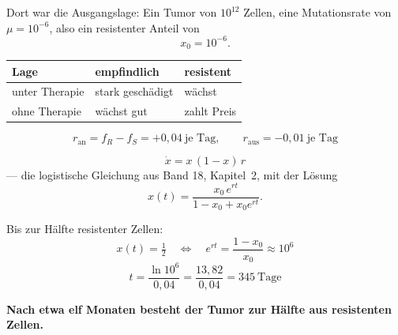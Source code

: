 \begin{merksatz}
Dort war die Ausgangslage: Ein Tumor von $10^{12}$ Zellen, eine Mutationsrate von $\mu = 10^{-6}$, also ein resistenter Anteil von
\[ x_0 = 10^{-6} . \]

\begin{center}
{\small
\renewcommand{\arraystretch}{1.5}
\begin{tabular}{@{}P{2.4cm}P{2.6cm}P{2.6cm}@{}}
\toprule
\textbf{Lage} & \textbf{empfindlich} & \textbf{resistent}\\
\midrule
unter Therapie & stark geschädigt & wächst\\
ohne Therapie & wächst gut & zahlt Preis\\
\bottomrule
\end{tabular}}
\end{center}

\[ r_{\text{an}} = f_R - f_S = +0{,}04 \ \text{je Tag}, \qquad r_{\text{aus}} = -0{,}01 \ \text{je Tag} \]

\[ \dot x = x\,(1-x)\,r \]
--- die logistische Gleichung aus Band 18, Kapitel~2, mit der Lösung
\[ x(t) = \frac{x_0\,e^{rt}}{1-x_0+x_0 e^{rt}} . \]

\begin{center}
\begin{minipage}{0.88\textwidth}
\end{minipage}
\end{center}
\end{merksatz}

\begin{merksatz}
Bis zur Hälfte resistenter Zellen:
\[ x(t) = \tfrac12 \quad\Longleftrightarrow\quad e^{rt} = \frac{1-x_0}{x_0} \approx 10^{6} \]
\[ t = \frac{\ln 10^{6}}{0{,}04} = \frac{13{,}82}{0{,}04} = 345 \ \text{Tage} \]

\begin{center}
\begin{minipage}{0.9\textwidth}
\textbf{Nach etwa elf Monaten besteht der Tumor zur Hälfte aus resistenten Zellen.}
\end{minipage}
\end{center}

\begin{center}
\begin{minipage}{0.88\textwidth}
\end{minipage}
\end{center}
\end{merksatz}

